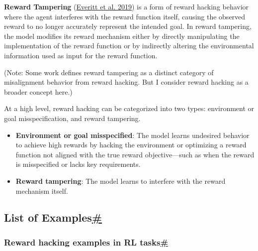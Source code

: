 \textbf{Reward Tampering} (\href{https://arxiv.org/abs/1908.04734}{Everitt et al. 2019}) is a form of reward hacking behavior where the agent interferes with the reward function itself, causing the observed reward to no longer accurately represent the intended goal. In reward tampering, the model modifies its reward mechanism either by directly manipulating the implementation of the reward function or by indirectly altering the environmental information used as input for the reward function.

(Note: Some work defines reward tampering as a distinct category of misalignment behavior from reward hacking. But I consider reward hacking as a broader concept here.)

At a high level, reward hacking can be categorized into two types: environment or goal misspecification, and reward tampering.

\begin{itemize}
\tightlist
\item
  \textbf{Environment or goal misspecified}: The model learns undesired behavior to achieve high rewards by hacking the environment or optimizing a reward function not aligned with the true reward objective---such as when the reward is misspecified or lacks key requirements.
\item
  \textbf{Reward tampering}: The model learns to interfere with the reward mechanism itself.
\end{itemize}

\subsection{\texorpdfstring{List of Examples\hyperref[list-of-examples]{\#}}{List of Examples\#}}\label{list-of-examples}

\subsubsection{\texorpdfstring{Reward hacking examples in RL tasks\hyperref[reward-hacking-examples-in-rl-tasks]{\#}}{Reward hacking examples in RL tasks\#}}\label{reward-hacking-examples-in-rl-tasks}

